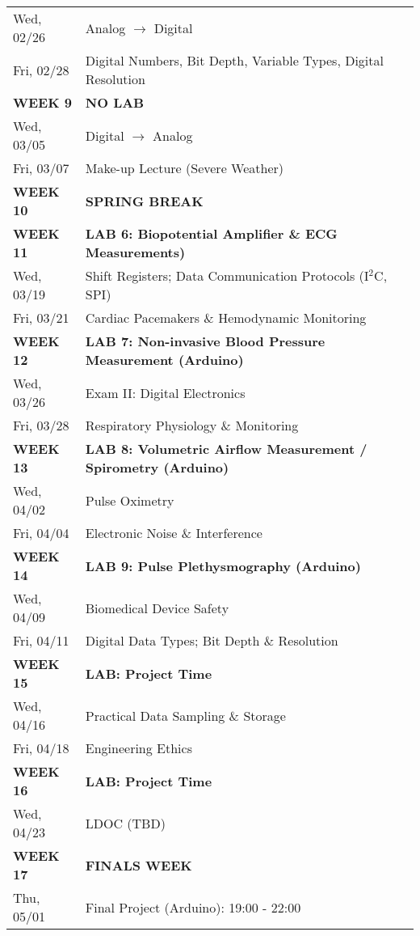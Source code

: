 \begin{tabular}{|l|l|}
Wed, 02/26  &   Analog $\rightarrow$ Digital \\ 
Fri, 02/28  &   Digital Numbers, Bit Depth, Variable Types, Digital Resolution \\ \hline
{\bf WEEK 9}      &   {\bf NO LAB} \\
Wed, 03/05  &   Digital $\rightarrow$ Analog \\ 
Fri, 03/07  &   Make-up Lecture (Severe Weather) \\ \hline
{\bf WEEK 10}     &   {\bf SPRING BREAK} \\ \hline
{\bf WEEK 11}     &   {\bf LAB 6: Biopotential Amplifier \& ECG Measurements)} \\
Wed, 03/19  &   Shift Registers; Data Communication Protocols (I$^2$C, SPI)\\
Fri, 03/21  &   Cardiac Pacemakers \& Hemodynamic Monitoring \\ \hline
{\bf WEEK 12}     &   {\bf LAB 7: Non-invasive Blood Pressure Measurement (Arduino)} \\
Wed, 03/26  &   Exam II: Digital Electronics \\ 
Fri, 03/28  &   Respiratory Physiology \& Monitoring \\  \hline
{\bf WEEK 13}     &   {\bf LAB 8: Volumetric Airflow Measurement / Spirometry (Arduino)} \\
Wed, 04/02  &   Pulse Oximetry \\ 
Fri, 04/04  &   Electronic Noise \& Interference \\ \hline
{\bf WEEK 14}     &   {\bf LAB 9: Pulse Plethysmography (Arduino)} \\
Wed, 04/09  &   Biomedical Device Safety \\
Fri, 04/11  &   Digital Data Types; Bit Depth \& Resolution \\ \hline
{\bf WEEK 15}     &   {\bf LAB: Project Time} \\
Wed, 04/16  &   Practical Data Sampling \& Storage \\
Fri, 04/18  &   Engineering Ethics \\ \hline
{\bf WEEK 16}     &   {\bf LAB: Project Time} \\
Wed, 04/23  &   LDOC (TBD) \\ \hline
{\bf WEEK 17}     &   {\bf FINALS WEEK} \\
Thu, 05/01  &   Final Project (Arduino): 19:00 - 22:00 \\ \hline
\end{tabular}
